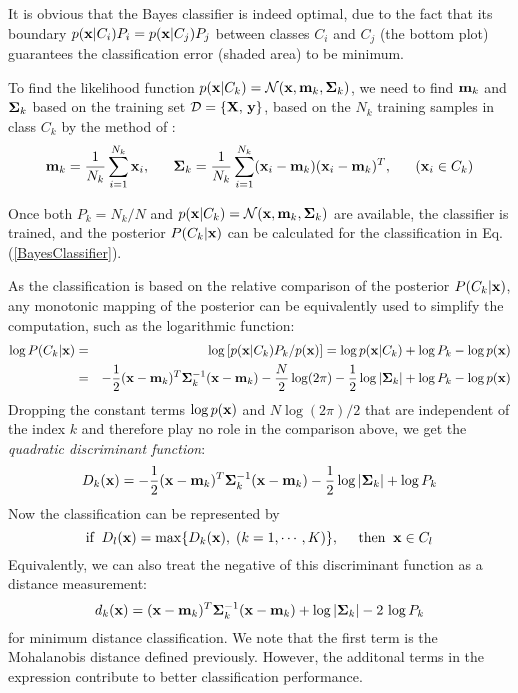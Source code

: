 \documentclass{article}
\begin{document}

It is obvious that the Bayes classifier is indeed optimal, due to 
the fact that its boundary $p({\bf x}|C_i)P_i=p({\bf x}|C_j)P_j$
between classes $C_i$ and $C_j$ (the bottom plot) guarantees the 
classification error (shaded area) to be minimum.

To find the likelihood function
$p({\bf x}|C_k)={\cal N}({\bf x},{\bf m}_k,{\bf\Sigma}_k)$, we need
to find ${\bf m}_k$ and ${\bf\Sigma}_k$ based on the training set 
${\cal D}=\{{\bf X},\,{\bf y}\}$, based on the $N_k$ training samples 
in class $C_k$ by the method of 
:
\begin{equation}
  {\bf m}_k=\frac{1}{N_k}\sum_{i=1}^{N_k} {\bf x}_i,
  \;\;\;\;\;\;
  {\bf\Sigma}_k=\frac{1}{N_k}\sum_{i=1}^{N_k} 
  ({\bf x}_i-{\bf m}_k)({\bf x}_i-{\bf m}_k)^T,
  \;\;\;\;\;\;({\bf x}_i\in C_k)
\end{equation}

Once both $P_k=N_k/N$ and 
$p({\bf x}|C_k)={\cal N}({\bf x},{\bf m}_k,{\bf\Sigma}_k)$
are available, the classifier is trained, and the posterior 
$P(C_k|{\bf x})$ can be calculated for the classification in 
Eq. (\ref{BayesClassifier}).

As the classification is based on the relative comparison of the 
posterior $P(C_k|{\bf x})$, any monotonic mapping of the posterior 
can be equivalently used to simplify the computation, such as the 
logarithmic function:
\begin{eqnarray}
  \log P(C_k|{\bf x})&=&\log \left[ p({\bf x}|C_k) P_k/p({\bf x}) \right]
  =\log p({\bf x}|C_k) +\log P_k-\log p({\bf x})
  \nonumber\\
  &=&-\frac{1}{2}({\bf x}-{\bf m}_k)^T{\bf \Sigma}_k^{-1}({\bf x}-{\bf m}_k)
  -\frac{N}{2}\log(2\pi)-\frac{1}{2}\log|{\bf\Sigma}_k|
  +\log P_k-\log p({\bf x})
\end{eqnarray}
Dropping the constant terms $\log p({\bf x})$ and $N \log(2\pi)/2$ 
that are independent of the index $k$ and therefore play no role in
the comparison above, we get the {\em quadratic discriminant function}:
\begin{equation}
  D_k({\bf x})=-\frac{1}{2}({\bf x}-{\bf m}_k)^T{\bf \Sigma}_k^{-1}({\bf x}-{\bf m}_k)
  -\frac{1}{2}\log|{\bf\Sigma}_k|+\log P_k
\end{equation}
Now the classification can be represented by
\begin{equation}
  \mbox{if}\;\; D_l({\bf x})=\max \{ D_k({\bf x}),\;(k=1,\cdots,K)\},
  \;\;\;\;\;\mbox{then}\;\;{\bf x}\in C_l
\end{equation}
Equivalently, we can also treat the negative of this discriminant 
function as a distance measurement:
\begin{equation}
  d_k({\bf x})=({\bf x}-{\bf m}_k)^T{\bf \Sigma}_k^{-1}({\bf x}-{\bf m}_k)
  +\log|{\bf\Sigma}_k|-2\,\log P_k
\end{equation}
for minimum distance classification. We note that the first term is the
Mohalanobis distance defined previously. However, the additonal terms in 
the expression contribute to better classification performance.
\end{document}
